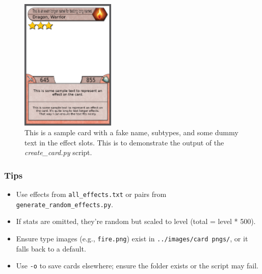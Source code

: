 \begin{figure}[h]
	\centering
	\includegraphics[width=0.4\textwidth]{images/sample_generated_output.png} 
	\caption{This is a sample card with a fake name, subtypes, and some dummy text in the effect slots. This is to demonstrate the output of the \textit{create\_card.py} script.}
	\label{fig:sample_generated_output}
\end{figure}

\subsubsection{Tips}
\begin{itemize}
	\item Use effects from \texttt{all\_effects.txt} or pairs from \texttt{generate\_random\_effects.py}.
	\item If stats are omitted, they’re random but scaled to level (total = level * 500).
	\item Ensure type images (e.g., \texttt{fire.png}) exist in \texttt{../images/card pngs/}, or it falls back to a default.
	\item Use \texttt{-o} to save cards elsewhere; ensure the folder exists or the script may fail.
\end{itemize}




